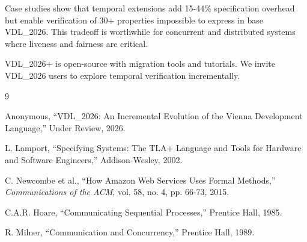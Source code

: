 \documentclass[conference]{IEEEtran}
\begin{document}
Case studies show that temporal extensions add 15-44\% specification overhead but enable verification of 30+ properties impossible to express in base VDL\_2026. This tradeoff is worthwhile for concurrent and distributed systems where liveness and fairness are critical.

VDL\_2026+ is open-source with migration tools and tutorials. We invite VDL\_2026 users to explore temporal verification incrementally.

\begin{thebibliography}{9}

Anonymous, ``VDL\_2026: An Incremental Evolution of the Vienna Development Language,'' Under Review, 2026.

L. Lamport, ``Specifying Systems: The TLA+ Language and Tools for Hardware and Software Engineers,'' Addison-Wesley, 2002.

C. Newcombe et al., ``How Amazon Web Services Uses Formal Methods,'' \textit{Communications of the ACM}, vol. 58, no. 4, pp. 66-73, 2015.

C.A.R. Hoare, ``Communicating Sequential Processes,'' Prentice Hall, 1985.

R. Milner, ``Communication and Concurrency,'' Prentice Hall, 1989.

\end{thebibliography}
\end{document}
